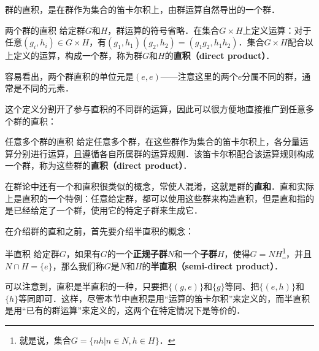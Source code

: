 
群的直积，是在群作为集合的笛卡尔积上，由群运算自然导出的一个群．

\begin{definition}{两个群的直积}
给定群$G$和$H$，群运算的符号省略．在集合$G\times H$上定义运算：对于任意$(g_i, h_i)\in G\times H$，有$(g_1, h_1)(g_2, h_2)=(g_1g_2, h_1h_2)$．集合$G\times H$配合以上定义的运算，构成一个群，称为群$G$和$H$的\textbf{直积（direct product）}．
\end{definition}

容易看出，两个群直积的单位元是$(e, e)$——注意这里的两个$e$分属不同的群，通常是不同的元素．

这个定义分割开了参与直积的不同群的运算，因此可以很方便地直接推广到任意多个群的直积：

\begin{definition}{任意多个群的直积}
给定任意多个群，在这些群作为集合的笛卡尔积上，各分量运算分别进行运算，且遵循各自所属群的运算规则．该笛卡尔积配合该运算规则构成一个群，称为这些群的\textbf{直积（direct product）}．
\end{definition}

在群论中还有一个和直积很类似的概念，常使人混淆，这就是群的\textbf{直和}．直和实际上是直积的一个特例：任意给定群，都可以使用这些群来构造直积，但是直和指的是已经给定了一个群，使用它的特定子群来生成它．

在介绍群的直和之前，首先要介绍半直积的概念：

\begin{definition}{半直积}
给定群$G$，如果有$G$的一个\textbf{正规子群}$N$和一个\textbf{子群}$H$，使得$G=NH$\footnote{就是说，集合$G=\{nh|n\in N, h\in H\}$．}，并且$N\cap H=\{e\}$，那么我们称$G$是$N$和$H$的\textbf{半直积（semi-direct product）}．
\end{definition}

可以注意到，直积是半直积的一种，只要把$\{(g, e)\}$和$\{g\}$等同、把$\{(e, h)\}$和$\{h\}$等同即可．这样，尽管本节中直积是用“运算的笛卡尔积”来定义的，而半直积是用“已有的群运算”来定义的，这两个在特定情况下是等价的．











